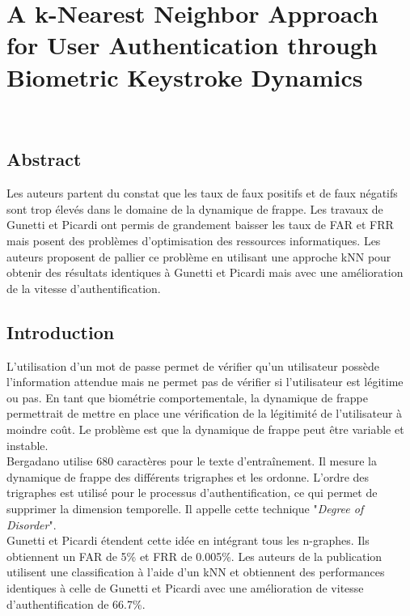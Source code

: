 \section{A k-Nearest Neighbor Approach for User Authentication through Biometric Keystroke Dynamics\cite{Hu2008}}

\\

\subsection{Abstract}

Les auteurs partent du constat que les taux de faux positifs et de faux négatifs sont trop élevés dans le domaine de la dynamique de frappe. Les travaux de Gunetti et Picardi ont permis de grandement baisser les taux de FAR et FRR mais posent des problèmes d'optimisation des ressources informatiques. Les auteurs proposent de pallier ce problème en utilisant une approche kNN pour obtenir des résultats identiques à Gunetti et Picardi mais avec une amélioration de la vitesse d'authentification.\\

\subsection{Introduction}

L'utilisation d'un mot de passe permet de vérifier qu'un utilisateur possède l'information attendue mais ne permet pas de vérifier si l'utilisateur est légitime ou pas. En tant que biométrie comportementale, la dynamique de frappe permettrait de mettre en place une vérification de la légitimité de l'utilisateur à moindre coût. Le problème est que la dynamique de frappe peut être variable et instable.\\

Bergadano\cite{bergadano2002} utilise 680 caractères pour le texte d'entraînement. Il mesure la dynamique de frappe des différents trigraphes et les ordonne. L'ordre des trigraphes est utilisé pour le processus d'authentification, ce qui permet de supprimer la dimension temporelle. Il appelle cette technique "\textit{Degree of Disorder}".\\

Gunetti et Picardi\cite{gunetti2005} étendent cette idée en intégrant tous les n-graphes. Ils obtiennent un FAR de 5\% et FRR de 0.005\%. Les auteurs de la publication utilisent une classification à l'aide d'un kNN et obtiennent des performances identiques à celle de Gunetti et Picardi avec une amélioration de vitesse d'authentification de 66.7\%.

